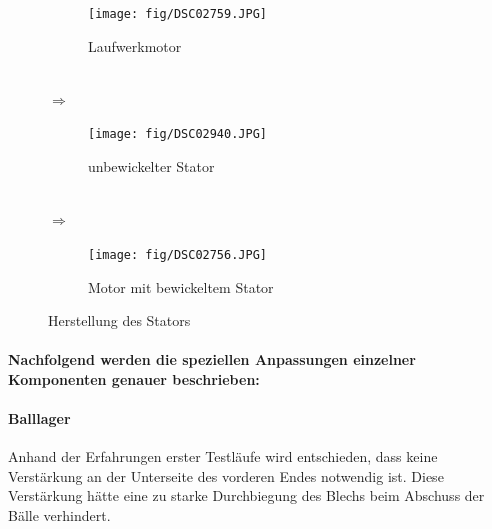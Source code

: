 \begin{figure}[h!]
    \begin{center}
        \begin{minipage}[c]{0.25\textwidth}
            \begin{subfigure}[a]{\textwidth}
                \texttt{[image: fig/DSC02759.JPG]}
                \caption{Laufwerkmotor \\ $\qquad$}
                \label{m_motor_stator_before}
            \end{subfigure}
        \end{minipage}
        \begin{minipage}[c]{0.05\textwidth}
            \Huge$\Rightarrow$
        \end{minipage}
        \begin{minipage}[c]{0.25\textwidth}
            \begin{subfigure}[a]{\textwidth}
                \texttt{[image: fig/DSC02940.JPG]}
                \caption{unbewickelter Stator \\ $\qquad$}
                \label{m_motor_stator_empty}
            \end{subfigure}
        \end{minipage}
        \begin{minipage}[c]{0.05\textwidth}
            \Huge$\Rightarrow$
        \end{minipage}
        \begin{minipage}[c]{0.25\textwidth}
            \begin{subfigure}[a]{\textwidth}
                \texttt{[image: fig/DSC02756.JPG]}
                \caption{Motor mit bewickeltem Stator}
                \label{m_motor_stator_finished}
            \end{subfigure}
        \end{minipage}
    \end{center}
    \caption{Herstellung des Stators}
    \label{m_motor_stator}
\end{figure}
\FloatBarrier

\clearpage
\paragraph{Nachfolgend werden die speziellen Anpassungen einzelner Komponenten genauer beschrieben:}

\paragraph{Balllager}
Anhand der Erfahrungen erster Testläufe wird entschieden, dass keine 
Verstärkung an der Unterseite des vorderen Endes notwendig ist. Diese 
Verstärkung hätte eine zu starke Durchbiegung des Blechs beim 
Abschuss der Bälle verhindert.

